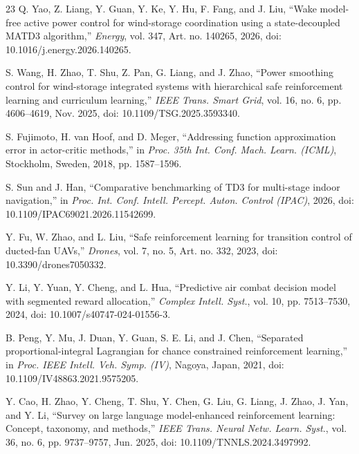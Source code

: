 \documentclass[lettersize,journal]{IEEEtran}
\begin{document}
\begin{thebibliography}{23}
Q. Yao, Z. Liang, Y. Guan, Y. Ke, Y. Hu, F. Fang, and J. Liu, ``Wake model-free active power control for wind-storage coordination using a state-decoupled MATD3 algorithm,'' \textit{Energy}, vol. 347, Art. no. 140265, 2026, doi: 10.1016/j.energy.2026.140265.

S. Wang, H. Zhao, T. Shu, Z. Pan, G. Liang, and J. Zhao, ``Power smoothing control for wind-storage integrated systems with hierarchical safe reinforcement learning and curriculum learning,'' \textit{IEEE Trans. Smart Grid}, vol. 16, no. 6, pp. 4606--4619, Nov. 2025, doi: 10.1109/TSG.2025.3593340.

S. Fujimoto, H. van Hoof, and D. Meger, ``Addressing function approximation error in actor-critic methods,'' in \textit{Proc. 35th Int. Conf. Mach. Learn. (ICML)}, Stockholm, Sweden, 2018, pp. 1587--1596.

S. Sun and J. Han, ``Comparative benchmarking of TD3 for multi-stage indoor navigation,'' in \textit{Proc. Int. Conf. Intell. Percept. Auton. Control (IPAC)}, 2026, doi: 10.1109/IPAC69021.2026.11542699.

Y. Fu, W. Zhao, and L. Liu, ``Safe reinforcement learning for transition control of ducted-fan UAVs,'' \textit{Drones}, vol. 7, no. 5, Art. no. 332, 2023, doi: 10.3390/drones7050332.

Y. Li, Y. Yuan, Y. Cheng, and L. Hua, ``Predictive air combat decision model with segmented reward allocation,'' \textit{Complex Intell. Syst.}, vol. 10, pp. 7513--7530, 2024, doi: 10.1007/s40747-024-01556-3.

B. Peng, Y. Mu, J. Duan, Y. Guan, S. E. Li, and J. Chen, ``Separated proportional-integral Lagrangian for chance constrained reinforcement learning,'' in \textit{Proc. IEEE Intell. Veh. Symp. (IV)}, Nagoya, Japan, 2021, doi: 10.1109/IV48863.2021.9575205.

Y. Cao, H. Zhao, Y. Cheng, T. Shu, Y. Chen, G. Liu, G. Liang, J. Zhao, J. Yan, and Y. Li, ``Survey on large language model-enhanced reinforcement learning: Concept, taxonomy, and methods,'' \textit{IEEE Trans. Neural Netw. Learn. Syst.}, vol. 36, no. 6, pp. 9737--9757, Jun. 2025, doi: 10.1109/TNNLS.2024.3497992.


\end{thebibliography}
\end{document}
